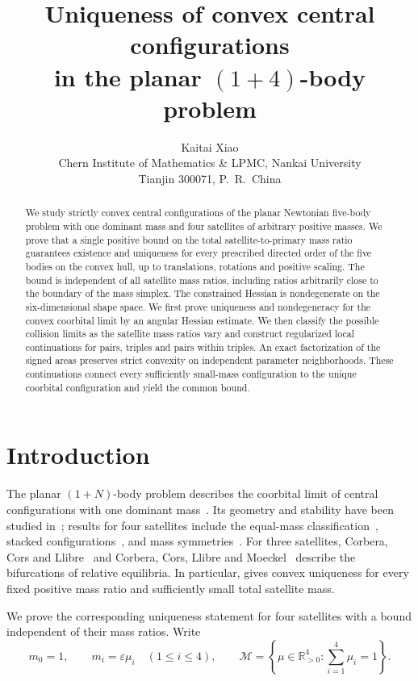 \documentclass[11pt,a4paper]{article}
\title{Uniqueness of convex central configurations\\
in the planar $(1+4)$-body problem}
\author{Kaitai Xiao\\[3pt]
\small Chern Institute of Mathematics \& LPMC, Nankai University\\
\small Tianjin 300071, P.\ R.\ China
\ifdefempty{\authoremail}{}{\\
\small Corresponding author: \texttt{\authoremail}}}
\date{}
\numberwithin{equation}{section}
\theoremstyle{remark}
\newcommand{\R}{\mathbb R}
\newcommand{\M}{\mathcal M}
\newcommand{\eps}{\varepsilon}
\begin{document}
\maketitle
\begingroup
\renewcommand{\thefootnote}{}
\endgroup

\begin{abstract}
We study strictly convex central configurations of the planar Newtonian five-body problem with one dominant mass and four satellites of arbitrary positive masses. We prove that a single positive bound on the total satellite-to-primary mass ratio guarantees existence and uniqueness for every prescribed directed order of the five bodies on the convex hull, up to translations, rotations and positive scaling. The bound is independent of all satellite mass ratios, including ratios arbitrarily close to the boundary of the mass simplex. The constrained Hessian is nondegenerate on the six-dimensional shape space. We first prove uniqueness and nondegeneracy for the convex coorbital limit by an angular Hessian estimate. We then classify the possible collision limits as the satellite mass ratios vary and construct regularized local continuations for pairs, triples and pairs within triples. An exact factorization of the signed areas preserves strict convexity on independent parameter neighborhoods. These continuations connect every sufficiently small-mass configuration to the unique coorbital configuration and yield the common bound.
\end{abstract}

\section{Introduction}\label{sec:intro}

The planar $(1+N)$-body problem describes the coorbital limit of central configurations with one dominant mass~\cite{CLN}. Its geometry and stability have been studied in~\cite{Moeckel94,RS}; results for four satellites include the equal-mass classification~\cite{AF,CLO}, stacked configurations~\cite{OC}, and mass symmetries~\cite{DHW}. For three satellites, Corbera, Cors and Llibre~\cite{CCL} and Corbera, Cors, Llibre and Moeckel~\cite{CCLM} describe the bifurcations of relative equilibria. In particular, \cite[Theorem~2]{CCLM} gives convex uniqueness for every fixed positive mass ratio and sufficiently small total satellite mass.

We prove the corresponding uniqueness statement for four satellites with a bound independent of their mass ratios. Write
\begin{equation}\label{eq:masses}
 m_0=1,\qquad m_i=\eps\mu_i\quad(1\le i\le4),\qquad
 \M=\left\{\mu\in\R_{>0}^4:\sum_{i=1}^4\mu_i=1\right\}.
\end{equation}
\end{document}
